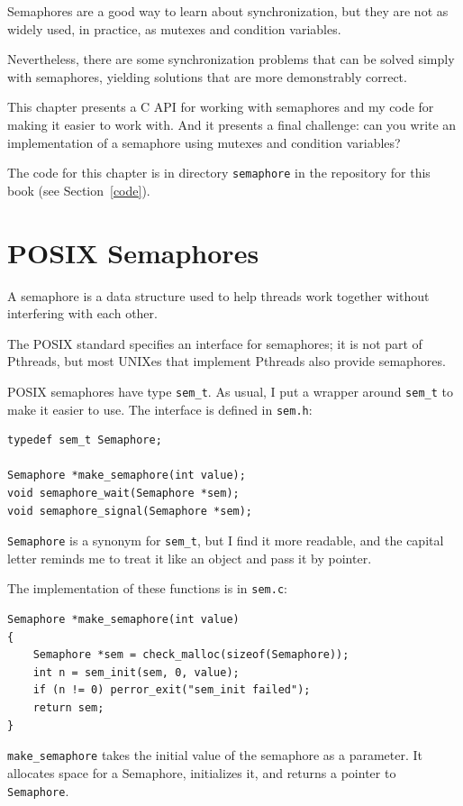 \documentclass[12pt]{book}
\begin{document}
{Semaphores are a good way to learn about synchronization, but
they are not as widely used, in practice, as mutexes and
condition variables.

Nevertheless, there are some synchronization problems that can be
solved simply with semaphores, yielding solutions that are more
demonstrably correct.

This chapter presents a C API for working with semaphores and
my code for making it easier to work with.  And it presents
a final challenge: can you write an implementation of a semaphore
using mutexes and condition variables?

The code for this chapter is in directory {\tt semaphore} in the
repository for this book (see Section~\ref{code}).


\section{POSIX Semaphores}

A semaphore is a data structure used to help threads work together
without interfering with each other.

The POSIX standard specifies an interface for semaphores;
it is not part of Pthreads, but most UNIXes
that implement Pthreads also provide semaphores.

POSIX semaphores have type {\tt sem\_t}.
As usual, I put a wrapper around {\tt sem\_t}
to make it easier to use.  The interface is defined in {\tt sem.h}:

\begin{verbatim}
typedef sem_t Semaphore;

Semaphore *make_semaphore(int value);
void semaphore_wait(Semaphore *sem);
void semaphore_signal(Semaphore *sem);
\end{verbatim}

{\tt Semaphore} is a synonym for \verb"sem_t", but I find it more
readable, and the capital letter reminds me to treat it like an
object and pass it by pointer.

The implementation of these functions is in {\tt sem.c}:

\begin{verbatim}
Semaphore *make_semaphore(int value)
{
    Semaphore *sem = check_malloc(sizeof(Semaphore));
    int n = sem_init(sem, 0, value);
    if (n != 0) perror_exit("sem_init failed");
    return sem;
}
\end{verbatim}

{\tt make\_semaphore} takes the initial value of the semaphore
as a parameter.  It allocates space for a Semaphore, initializes
it, and returns a pointer to {\tt Semaphore}.

}
\end{document}
